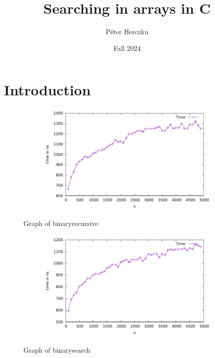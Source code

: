 \documentclass[a4paper,11pt]{article}
\begin{document}
    \title{
        \textbf{Searching in arrays in C}
    }
    \author{Péter Herczku}
    \date{Fall 2024}

    \maketitle

    \section*{Introduction}
    \begin{figure}[h]
        \centering
        \begin{subfigure}[b]{.5\textwidth}
            \centering
            \includegraphics[width=\textwidth]{./binary_recursive/data} %
        \end{subfigure}
        \caption{Graph of binaryrecursive}
        \label{fig:graph_1}
    \end{figure}
    \begin{figure}[h]
        \centering
        \begin{subfigure}[b]{.5\textwidth}
            \centering
            \includegraphics[width=\textwidth]{./binary_search/data} %
        \end{subfigure}
        \caption{Graph of binarysearch}
        \label{fig:graph_2}
    \end{figure}
\end{document}
